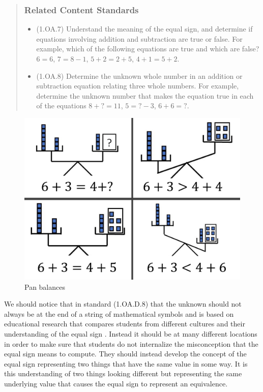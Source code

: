 \documentclass[
]{book}
\providecommand{\tightlist}{%
  \setlength{\itemsep}{0pt}\setlength{\parskip}{0pt}}
\theoremstyle{definition}
\theoremstyle{definition}
\theoremstyle{definition}
\theoremstyle{remark}
\begin{document}
\begin{quote}
\hypertarget{related-content-standards-3}{%
\subsubsection*{Related Content Standards}\label{related-content-standards-3}}

\begin{itemize}
\tightlist
\item
  (1.OA.7) Understand the meaning of the equal sign, and determine if equations involving addition and subtraction are true or false. For example, which of the following equations are true and which are false? \(6 = 6\), \(7 = 8 - 1\), \(5 + 2 = 2 + 5\), \(4 + 1 = 5 + 2\).
\item
  (1.OA.8) Determine the unknown whole number in an addition or subtraction equation relating three whole numbers. For example, determine the unknown number that makes the equation true in each of the equations \(8 + ? = 11\), \(5 = ? - 3\), \(6 + 6 = ?\).
\end{itemize}
\end{quote}

\begin{figure}

{\centering \includegraphics[width=0.4\linewidth]{images/balance-scales} 

}

\caption{Pan balances}\label{fig:pan-balance}
\end{figure}

We should notice that in standard (1.OA.D.8) that the unknown should not always be at the end of a string of mathematical symbols and is based on educational research that compares students from different cultures and their understanding of the equal sign \citep[pp.~148-150]{Cognition}. Instead it should be at many different locations in order to make sure that students do not internalize the misconception that the equal sign means to compute. They should instead develop the concept of the equal sign representing two things that have the same value in some way. It is this understanding of two things looking different but representing the same underlying value that causes the equal sign to represent an equivalence.
\end{document}
